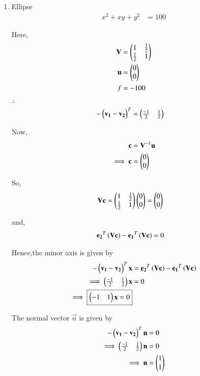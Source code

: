 \documentclass[journal,12pt,twocolumn]{IEEEtran}
\begin{document}
\begin{enumerate}
    \item Ellipse
    \begin{align}
        x^2+xy+y^2 &= 100
    \end{align}
    
    Here,
    \begin{align}
    \mathbf{V} &= \begin{pmatrix}1 & \frac{1}{2} \\ \frac{1}{2} & 1\end{pmatrix} \\
    \mathbf{u} &= \begin{pmatrix}0 \\ 0\end{pmatrix} \\
    f &= -100
    \end{align}

    $\therefore$
    \begin{align}
    -\begin{pmatrix}\mathbf{v_1}-\mathbf{v_2}\end{pmatrix}^T &= \begin{pmatrix}\frac{-1}{2} & \frac{1}{2}\end{pmatrix}
    \end{align}

    Now,
    \begin{align}
    \mathbf{c} &= \mathbf{V}^{-1}\mathbf{u}\\
    \implies \mathbf{c} &= \begin{pmatrix}0 \\ 0\end{pmatrix}
    \end{align}

    So,
    \begin{align}
    \mathbf{V}\mathbf{c} &= \begin{pmatrix}1 & \frac{1}{2} \\ \frac{1}{2} & 1\end{pmatrix}\begin{pmatrix}0 \\ 0\end{pmatrix}=\begin{pmatrix}0 \\ 0\end{pmatrix}
    \end{align}

    and,
    \begin{align}
    \mathbf{e_2}^T\left(\mathbf{V}\mathbf{c}\right) - \mathbf{e_1}^T\left(\mathbf{V}\mathbf{c}\right) &= 0
    \end{align}

    Hence,the minor axis is given by
    \begin{align}
    -\begin{pmatrix}\mathbf{v_1}-\mathbf{v_2}\end{pmatrix}^T\mathbf{x} &= \mathbf{e_2}^T\left(\mathbf{V}\mathbf{c}\right) - \mathbf{e_1}^T\left(\mathbf{V}\mathbf{c}\right) \\
    \implies \begin{pmatrix}\frac{-1}{2} & \frac{1}{2}\end{pmatrix}\mathbf{x} &= 0 \\
    \implies \boxed{\begin{pmatrix}-1 & 1\end{pmatrix}\mathbf{x} = 0}
    \end{align}
    
    The normal vector $\vec{n}$ is given by
    \begin{align}
        -\begin{pmatrix}\mathbf{v_1}-\mathbf{v_2}\end{pmatrix}^T\mathbf{n} &= 0
        \\
        \implies \begin{pmatrix}\frac{-1}{2} & \frac{1}{2}\end{pmatrix}\mathbf{n} &= 0
        \\
        \implies \mathbf{n} &= \begin{pmatrix}1 \\ 1\end{pmatrix}
    \end{align}
    

\end{enumerate}
\end{document}
